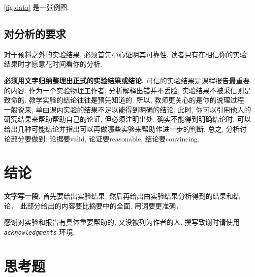 \documentclass[font=default]{mpltx}
\newcommand{\note}[1]{{\color{gray}#1}}
\newcommand*\cs[1]{\texttt{\textbackslash #1}}
\newcommand*\env[1]{\textit{\texttt{#1}}}
\newcommand*\file[1]{\textbf{\texttt{#1}}}
\begin{document}

\autoref{fig:data} 是一张例图.

\subsection{对分析的要求}

对于预料之外的实验结果, 必须首先小心证明其可靠性.
读者只有在相信你的实验结果时才愿意花时间看你的分析.

\textbf{必须用文字归纳整理出正式的实验结果或结论.}
可信的实验结果是课程报告最重要的内容.
作为一个实验物理工作者, 分析解释出错并不丢脸, 实验结果不被采信则是致命的.
教学实验的结论往往是预先知道的.
所以, 教师更关心的是你的说理过程.
一般说来, 单由课内实验的结果不足以能得到明确的结论.
此时, 你可以引用他人的研究结果来帮助帮助自己的论证, 但必须注明出处.
确实不能得到明确结论时, 可以给出几种可能结论并指出可以再做哪些实验来帮助作进一步的判断.
总之, 分析讨论部分要做到: 论据要valid, 论证要reasonable, 结论要convincing.

\section{结论}
\textbf{文字写一段.}
首先要给出实验结果, 然后再给出由实验结果分析得到的结果和结论．
此部分给出的内容要比摘要中的全面, 用词要更准确．

\begin{acknowledgments}
  感谢对实验和报告有具体重要帮助的, 又没被列为作者的人.
  \note{撰写致谢时请使用 \env{acknowledgments} 环境.}
\end{acknowledgments}



\clearpage %
\appendix %
\section{思考题}\label{app:exercise}
\end{document}
